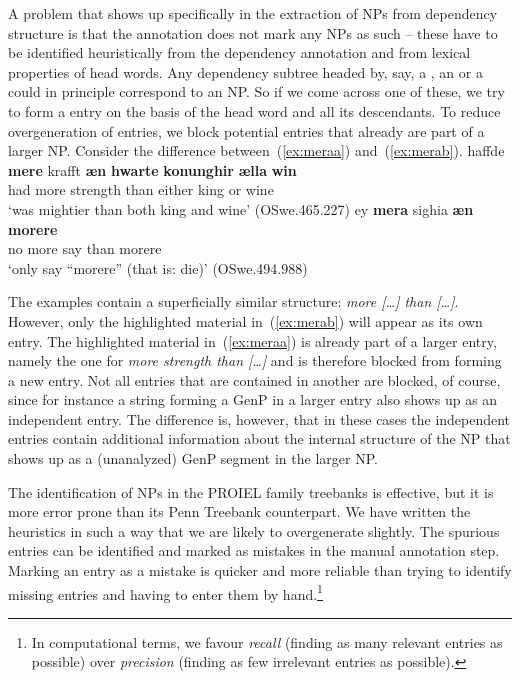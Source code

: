 \documentclass[output=paper,colorlinks,citecolor=brown]{langscibook}
\begin{document}
A problem that shows up specifically in the extraction of NPs from
dependency structure is that the annotation does not mark any NPs as
such -- these have to be identified heuristically from the dependency
annotation and from lexical properties of head words. Any dependency subtree headed by, say, a , an  or a  could in principle correspond to an NP. So if we come across one of these, we try to form a  entry on the basis of the head word and all its descendants. To reduce overgeneration of entries, we block potential entries that already are part of a larger NP. Consider the difference between~(\ref{ex:meraa}) and~(\ref{ex:merab}).
\ea\label{ex:mera}
  \ea \label{ex:meraa} {%
    \gll
    haffde \textbf{mere} krafft \textbf{æn} \textbf{hwarte} \textbf{konunghir} \textbf{ælla} \textbf{win}\\
    had more strength than either king or wine\\
    \glt
    `was mightier than both king and wine' (OSwe.465.227) 
  }
  \ex \label{ex:merab} {%
    \gll
    ey \textbf{mera} sighia \textbf{æn} \textbf{morere}\\
    no more say than morere\\
    \glt
    `only say ``morere'' (that is: die)'  (OSwe.494.988) 
  }
  \z
\z

\begin{sloppypar}
The examples contain a superficially similar structure: \textit{more [\ldots] than [\ldots]}. However,
only the highlighted material in~(\ref{ex:merab}) will appear as its own entry. The highlighted material in~(\ref{ex:meraa}) is already part
of a larger entry, namely the one for \textit{more strength than [\ldots]} and is therefore blocked from forming a new entry. Not all entries that are
contained in another are blocked, of course, since for instance a
string forming a GenP in a larger entry also shows up as an independent
entry. The difference is, however, that in these cases the independent
entries contain additional information about the internal structure of the NP that shows up as a (unanalyzed) GenP segment in the larger NP.
\end{sloppypar}

The identification of NPs in the PROIEL family treebanks is effective,
but it is more error prone than its Penn Treebank counterpart. We have
written the heuristics in such a way that we are likely to
overgenerate slightly. The spurious entries can be identified and
marked as mistakes in the manual annotation step. Marking an entry as
a mistake is quicker and more reliable than trying to identify missing
entries and having to enter them by hand.\footnote{In computational terms, we favour \textit{recall} (finding as many relevant entries as possible) over \textit{precision} (finding as few irrelevant entries as possible).}
\end{document}
